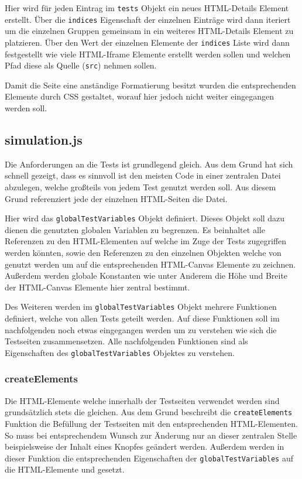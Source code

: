 Hier wird für jeden Eintrag im \lstinline{tests} Objekt ein neues HTML-Details Element erstellt. %
Über die \lstinline{indices} Eigenschaft der einzelnen Einträge wird dann iteriert um die einzelnen Gruppen gemeinsam in ein weiteres HTML-Details Element zu platzieren.
Über den Wert der einzelnen Elemente der \lstinline{indices} Liste wird dann festgestellt wie viele HTML-Iframe Elemente erstellt werden sollen und welchen Pfad diese als Quelle (\lstinline{src}) nehmen sollen.

Damit die Seite eine anständige Formatierung besitzt wurden die entsprechenden Elemente durch CSS gestaltet, worauf hier jedoch nicht weiter eingegangen werden soll.

\subsection{simulation.js}

Die Anforderungen an die Tests ist grundlegend gleich.
Aus dem Grund hat sich schnell gezeigt, dass es sinnvoll ist den meisten Code in einer zentralen Datei abzulegen, welche großteils von jedem Test genutzt werden soll.
Aus diesem Grund referenziert jede der einzelnen HTML-Seiten die  Datei.

Hier wird das \lstinline{globalTestVariables} Objekt definiert.
Dieses Objekt soll dazu dienen die genutzten globalen Variablen zu begrenzen.
Es beinhaltet alle Referenzen zu den HTML-Elementen auf welche im Zuge der Tests zugegriffen werden könnten, sowie den Referenzen zu den einzelnen  Objekten welche von  genutzt werden um auf die entsprechenden HTML-Canvas Elemente zu zeichnen.
Außerdem werden globale Konstanten wie unter Anderem die Höhe und Breite der HTML-Canvas Elemente hier zentral bestimmt.

Des Weiteren werden im \lstinline{globalTestVariables} Objekt mehrere Funktionen definiert, welche von allen Tests geteilt werden.
Auf diese Funktionen soll im nachfolgenden noch etwas eingegangen werden um zu verstehen wie sich die Testseiten zusammensetzen.
Alle nachfolgenden Funktionen sind als Eigenschaften des \lstinline{globalTestVariables} Objektes zu verstehen.

\subsubsection{createElements}

Die HTML-Elemente welche innerhalb der Testseiten verwendet werden sind grundsätzlich stets die gleichen.
Aus dem Grund beschreibt die \lstinline{createElements} Funktion die Befüllung der Testseiten mit den entsprechenden HTML-Elementen.
So muss bei entsprechendem Wunsch zur Änderung nur an dieser zentralen Stelle beispielsweise der Inhalt eines Knopfes geändert werden.
Außerdem werden in dieser Funktion die entsprechenden Eigenschaften der \lstinline{globalTestVariables} auf die HTML-Elemente und  gesetzt.

